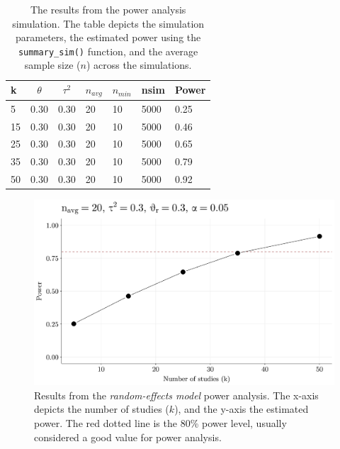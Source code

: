 \documentclass[
  man,floatsintext]{apa6}
\begin{document}
\begin{table}[H]

\begin{center}
\begin{threeparttable}

\caption{\label{tab:tab-power-analysis-example}The results from the power analysis simulation. The table depicts the simulation parameters, the estimated power using the \texttt{summary\_sim()} function, and the average sample size (\(n\)) across the simulations.}

\small{

\begin{tabular}{lllllll}
\toprule
k & \multicolumn{1}{c}{$\theta$} & \multicolumn{1}{c}{$\tau^2$} & \multicolumn{1}{c}{$n_{avg}$} & \multicolumn{1}{c}{$n_{min}$} & \multicolumn{1}{c}{nsim} & \multicolumn{1}{c}{Power}\\
\midrule
5 & 0.30 & 0.30 & 20 & 10 & 5000 & 0.25\\
15 & 0.30 & 0.30 & 20 & 10 & 5000 & 0.46\\
25 & 0.30 & 0.30 & 20 & 10 & 5000 & 0.65\\
35 & 0.30 & 0.30 & 20 & 10 & 5000 & 0.79\\
50 & 0.30 & 0.30 & 20 & 10 & 5000 & 0.92\\
\bottomrule
\end{tabular}

}

\end{threeparttable}
\end{center}

\end{table}

\normalsize

\scriptsize

\begin{figure}[H]

{\centering \includegraphics[width=0.8\linewidth]{paper_files/figure-latex/plot-power-analysis-1} 

}

\caption{Results from the \emph{random-effects model} power analysis. The x-axis depicts the number of studies (\(k\)), and the y-axis the estimated power. The red dotted line is the 80\% power level, usually considered a good value for power analysis.}\label{fig:plot-power-analysis}
\end{figure}
\end{document}
